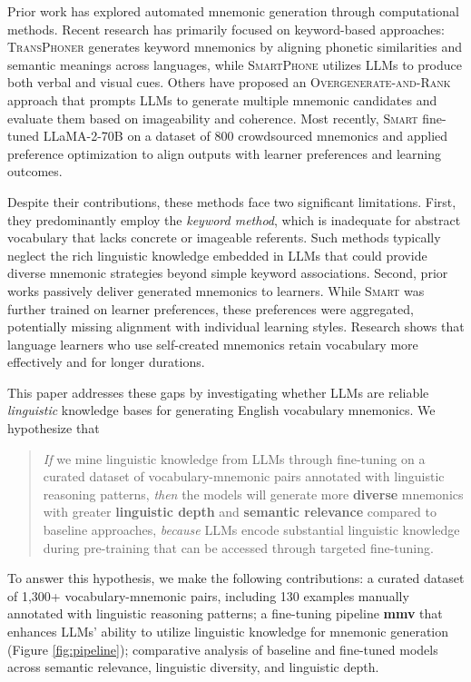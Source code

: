 \documentclass{article}
\newcounter{para}
\newcommand{\shorttitle}{\textbf{mmv }}
\begin{document}
Prior work has explored automated mnemonic generation through computational methods. Recent research has primarily focused on keyword-based approaches: \textsc{TransPhoner} generates keyword mnemonics by aligning phonetic similarities and semantic meanings across languages, while \textsc{SmartPhone} utilizes LLMs to produce both verbal and visual cues. Others have proposed an \textsc{Overgenerate-and-Rank} approach that prompts LLMs to generate multiple mnemonic candidates and evaluate them based on imageability and coherence. Most recently, \textsc{Smart} fine-tuned LLaMA-2-70B on a dataset of 800 crowdsourced mnemonics and applied preference optimization to align outputs with learner preferences and learning outcomes.

Despite their contributions, these methods face two significant limitations. First, they predominantly employ the \emph{keyword method}, which is inadequate for abstract vocabulary that lacks concrete or imageable referents. Such methods typically neglect the rich linguistic knowledge embedded in LLMs that could provide diverse mnemonic strategies beyond simple keyword associations. Second, prior works passively deliver generated mnemonics to learners. While \textsc{Smart} was further trained on learner preferences, these preferences were aggregated, potentially missing alignment with individual learning styles. Research shows that language learners who use self-created mnemonics retain vocabulary more effectively and for longer durations.

This paper addresses these gaps by investigating whether LLMs are reliable \emph{linguistic} knowledge bases for generating English vocabulary mnemonics. We hypothesize that
\begin{quote}
  \emph{If} we mine linguistic knowledge from LLMs through fine-tuning on a curated dataset of vocabulary-mnemonic pairs annotated with linguistic reasoning patterns, \emph{then} the models will generate more \textbf{diverse} mnemonics with greater \textbf{linguistic depth}  and \textbf{semantic relevance} compared to baseline approaches, \emph{because} LLMs encode substantial linguistic knowledge during pre-training that can be accessed through targeted fine-tuning.
\end{quote}

To answer this hypothesis, we make the following contributions: a curated dataset of 1,300+ vocabulary-mnemonic pairs, including 130 examples manually annotated with linguistic reasoning patterns; a fine-tuning pipeline \shorttitle that enhances LLMs' ability to utilize linguistic knowledge for mnemonic generation (Figure \ref{fig:pipeline}); comparative analysis of baseline and fine-tuned models across semantic relevance, linguistic diversity, and linguistic depth.
\end{document}
